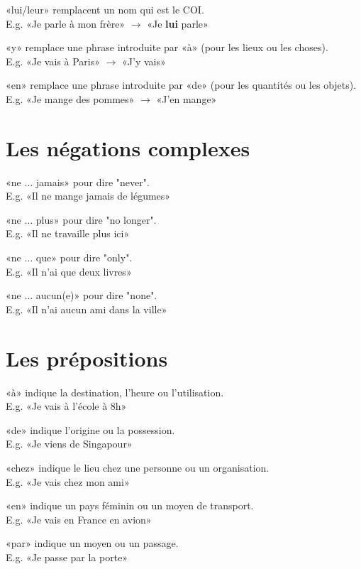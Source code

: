 \documentclass[12pt, a4paper]{article}
\begin{document}
\begin{multicols*}{3}
«lui/leur» remplacent un nom qui est le COI.\\
E.g. «Je parle à mon frère» $\rightarrow$ «Je \textbf{lui} parle»

«y» remplace une phrase introduite par «à» (pour les lieux ou les choses).\\
E.g. «Je vais à Paris» $\rightarrow$ «J'y vais»

«en» remplace une phrase introduite par «de» (pour les quantités ou les objets).\\
E.g. «Je mange des pommes» $\rightarrow$ «J'en  mange»

\section{Les négations complexes}
«ne $\ldots$ jamais» pour dire "never".\\
E.g. «Il ne mange jamais de légumes»

«ne $\ldots$ plus» pour dire "no longer".\\
E.g. «Il ne travaille plus ici»

«ne $\ldots$ que» pour dire "only".\\
E.g. «Il n'ai que deux livres»

«ne $\ldots$ aucun(e)» pour dire "none".\\
E.g. «Il n'ai aucun ami dans la ville»
\section{Les prépositions}
«à» indique la destination, l'heure ou l'utilisation.\\
E.g. «Je vais à l'école à 8h»

«de» indique l'origine ou la possession.\\
E.g. «Je viens de Singapour»

«chez» indique le lieu chez une personne ou un organisation.\\
E.g. «Je vais chez mon ami»

«en» indique un pays féminin ou un moyen de transport.\\
E.g. «Je vais en France en avion»

«par» indique un moyen ou un passage.\\
E.g. «Je passe par la porte»


\end{multicols*}
\end{document}
